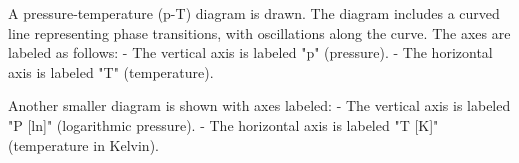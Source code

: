 A pressure-temperature (p-T) diagram is drawn. The diagram includes a curved line representing phase transitions, with oscillations along the curve. The axes are labeled as follows:  
- The vertical axis is labeled "p" (pressure).  
- The horizontal axis is labeled "T" (temperature).  

Another smaller diagram is shown with axes labeled:  
- The vertical axis is labeled "P [ln]" (logarithmic pressure).  
- The horizontal axis is labeled "T [K]" (temperature in Kelvin).
